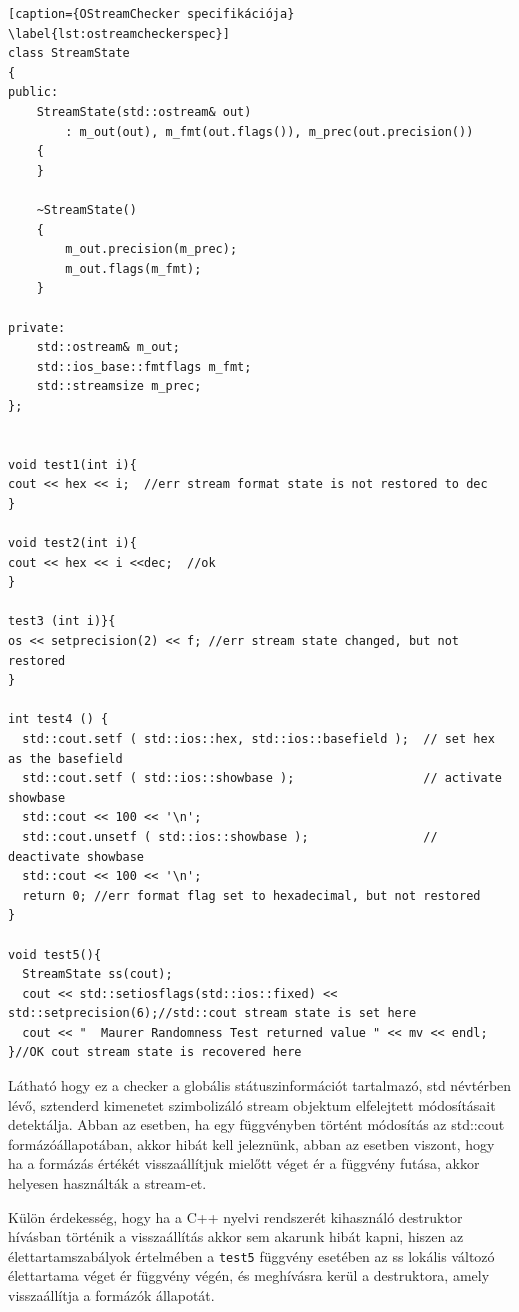 \documentclass[a4paper,12pt]{report}
\begin{document}
\begin{lstlisting}[caption={OStreamChecker specifikációja}
\label{lst:ostreamcheckerspec}]
class StreamState
{
public:
    StreamState(std::ostream& out)
        : m_out(out), m_fmt(out.flags()), m_prec(out.precision())
    {
    }

    ~StreamState()
    {
        m_out.precision(m_prec);
        m_out.flags(m_fmt);
    }

private:
    std::ostream& m_out;
    std::ios_base::fmtflags m_fmt;
    std::streamsize m_prec;
};


void test1(int i){
cout << hex << i;  //err stream format state is not restored to dec
}

void test2(int i){
cout << hex << i <<dec;  //ok
}

test3 (int i)}{
os << setprecision(2) << f; //err stream state changed, but not restored
}

int test4 () {
  std::cout.setf ( std::ios::hex, std::ios::basefield );  // set hex as the basefield
  std::cout.setf ( std::ios::showbase );                  // activate showbase
  std::cout << 100 << '\n';
  std::cout.unsetf ( std::ios::showbase );                // deactivate showbase
  std::cout << 100 << '\n';
  return 0; //err format flag set to hexadecimal, but not restored
}

void test5(){
  StreamState ss(cout);
  cout << std::setiosflags(std::ios::fixed) << std::setprecision(6);//std::cout stream state is set here
  cout << "  Maurer Randomness Test returned value " << mv << endl;
}//OK cout stream state is recovered here
\end{lstlisting}

Látható hogy ez a checker a globális státuszinformációt tartalmazó, std névtérben lévő, sztenderd kimenetet szimbolizáló stream objektum elfelejtett módosításait detektálja. Abban az esetben, ha egy függvényben történt módosítás az std::cout formázóállapotában, akkor hibát kell jeleznünk, abban az esetben viszont, hogy ha a formázás értékét visszaállítjuk mielőtt véget ér a függvény futása, akkor helyesen használták a stream-et.

Külön érdekesség, hogy ha a C++ nyelvi rendszerét kihasználó destruktor hívásban történik a visszaállítás akkor sem akarunk hibát kapni, hiszen az élettartamszabályok értelmében a \texttt{test5} függvény esetében az ss lokális változó élettartama véget ér függvény végén, és meghívásra kerül a destruktora, amely visszaállítja a formázók állapotát.
\end{document}
